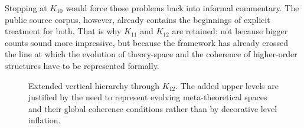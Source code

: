 Stopping at \(K_{10}\) would force those problems back into informal commentary. The public source
corpus, however, already contains the beginnings of explicit treatment for both. That is why
\(K_{11}\) and \(K_{12}\) are retained: not because bigger counts sound more impressive, but because the
framework has already crossed the line at which the evolution of theory-space and the coherence of
higher-order structures have to be represented formally.

\begin{figure}[htbp]
\centering

\caption{Extended vertical hierarchy through \(K_{12}\). The added upper levels are justified by
the need to represent evolving meta-theoretical spaces and their global coherence conditions rather
than by decorative level inflation.}
\label{fig:oc13-levels-k12}
\end{figure}

